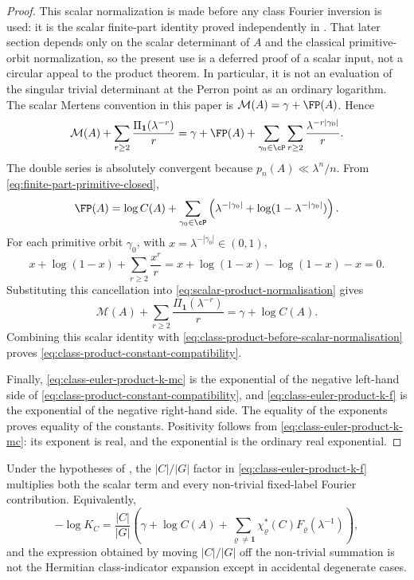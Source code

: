 \begin{proof}
  This scalar normalization is made before any class Fourier inversion is
  used: it is the scalar finite-part identity proved independently in
  .  That later section depends only on the scalar
  determinant of \(A\) and the classical primitive-orbit normalization, so the
  present use is a deferred proof of a scalar input, not a circular appeal to
  the product theorem.  In particular, it is not an evaluation of the singular
  trivial determinant at the Perron point as an ordinary logarithm.
  The scalar Mertens convention in this paper is
  \(\mathcal M(A)=\gamma+\FP(A)\). Hence
  \begin{equation}\label{eq:scalar-product-normalisation}
    \mathcal M(A)+\sum_{r\ge2}\frac{\Pi_{\mathbf1}(\lambda^{-r})}{r}
    =
    \gamma+\FP(A)+
    \sum_{\gamma_0\in\cP}\sum_{r\ge2}
      \frac{\lambda^{-r|\gamma_0|}}{r}.
  \end{equation}
  The double series is absolutely convergent because
  \(p_n(A)\ll\lambda^n/n\). From
  \eqref{eq:finite-part-primitive-closed},
  \[
    \FP(A)
    =
    \log C(A)+
    \sum_{\gamma_0\in\cP}
      \left(
        \lambda^{-|\gamma_0|}
        +\log(1-\lambda^{-|\gamma_0|})
      \right).
  \]
  For each primitive orbit \(\gamma_0\), with
  \(x=\lambda^{-|\gamma_0|}\in(0,1)\),
  \[
    x+\log(1-x)+\sum_{r\ge2}\frac{x^r}{r}
    =x+\log(1-x)-\log(1-x)-x=0.
  \]
  Substituting this cancellation into
  \eqref{eq:scalar-product-normalisation} gives
  \[
    \mathcal M(A)+\sum_{r\ge2}\frac{\Pi_{\mathbf1}(\lambda^{-r})}{r}
    =\gamma+\log C(A).
  \]
  Combining this scalar identity with
  \eqref{eq:class-product-before-scalar-normalisation} proves
  \eqref{eq:class-product-constant-compatibility}.

  Finally, \eqref{eq:class-euler-product-k-mc} is the exponential of the
  negative left-hand side of
  \eqref{eq:class-product-constant-compatibility}, and
  \eqref{eq:class-euler-product-k-f} is the exponential of the negative
  right-hand side. The equality of the exponents proves equality of the
  constants. Positivity follows from
  \eqref{eq:class-euler-product-k-mc}: its exponent is real, and the
  exponential is the ordinary real exponential.
\end{proof}

\begin{lemma}
  \label{lem:class-product-hermitian-normalisation}
  Under the hypotheses of , the
  \(|C|/|G|\) factor in \eqref{eq:class-euler-product-k-f} multiplies both
  the scalar term and every non-trivial fixed-label Fourier contribution.
  Equivalently,
  \begin{equation}\label{eq:class-product-normalisation-identity}
    -\log K_C
    =
    \frac{|C|}{|G|}
    \left(
      \gamma+\log C(A)
      +\sum_{\varrho\neq\mathbf1}
        \chi_\varrho^\ast(C)F_\varrho(\lambda^{-1})
    \right),
  \end{equation}
  and the expression obtained by moving \(|C|/|G|\) off the non-trivial
  summation is not the Hermitian class-indicator expansion except in
  accidental degenerate cases.
\end{lemma}

